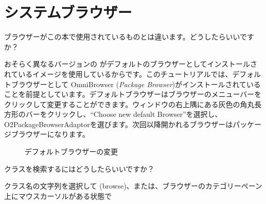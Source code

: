 \documentclass[a4paper,10pt,twoside]{book}
\begin{document}
\section{システムブラウザー}


\begin{faq}
ブラウザーがこの本で使用されているものとは違います。どうしたらいいですか？
\end{faq}
\answer
おそらく異なるバージョンの  がデフォルトのブラウザーとしてインストールされているイメージを使用しているからです。このチュートリアルでは、デフォルトブラウザーとして OmniBrowser (\emph{Package Browser})がインストールされていることを前提としています。デフォルトブラウザーはブラウザーのメニューバーをクリックして変更することができます。ウィンドウの右上隅にある灰色の角丸長方形のバーをクリックし、“Choose new default Browser”を選択し、O2PackageBrowserAdaptorを選びます。次回以降開かれるブラウザーはパッケージブラウザーになります。

\begin{figure}[tbh]
	\centering
	\hfill
	\hfill
	\caption{デフォルトブラウザーの変更}
\end{figure}

\begin{faq}
クラスを検索するにはどうしたらいいですか？
\end{faq}
\answer
クラス名の文字列を選択して  (browse)、または、ブラウザーのカテゴリーペーン上にマウスカーソルがある状態で 
\end{document}
